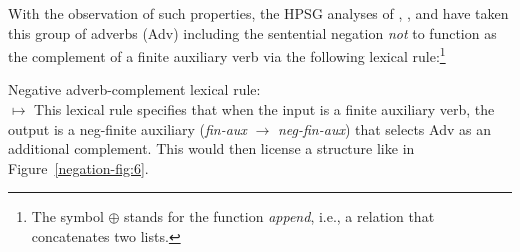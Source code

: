 \documentclass[output=paper
                ,modfonts
                ,nonflat
	        ,collection
	        ,collectionchapter
	        ,collectiontoclongg
 	        ,biblatex
                ,babelshorthands
                ,newtxmath
                ,draftmode
                ,colorlinks, citecolor=brown
]{./langsci/langscibook}
\begin{document}
{\begin{exe}
\begin{xlist}
\begin{exe}
\begin{xlist}
With the observation of such properties, the HPSG analyses of \citet{AG:97},
\citet{Kim:00}, and \citet{Warner2000a-u}
have taken this group of adverbs (Adv) including the sentential negation {\it not} to function as the complement of a finite auxiliary verb via the following lexical rule:\footnote{
The symbol $\oplus$ stands for the function {\it append}, i.e., a relation that concatenates two lists.}

\ea
Negative adverb-complement lexical rule:\\
 $\mapsto$
\z
%
This lexical rule specifies that when the input is a finite auxiliary verb,
the output is a neg-finite auxiliary (\textit{fin-aux} $\rightarrow$ \textit{neg-fin-aux})
that selects Adv as an additional complement. This would then
license a structure like in Figure~\ref{negation-fig:6}.



\end{xlist}
\end{exe}
\end{xlist}
\end{exe}}
\end{document}
